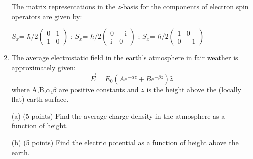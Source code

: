 \documentclass{article}
\begin{document}
\begin{enumerate}
The matrix representations in the $z$-basis for the components of electron spin operators are given by: 

\color{red}\textbf{$S_x$}= $\hbar/2 \begin{pmatrix} 0 & 1 \\ 1 & 0 \end{pmatrix}$ \color{purple}; \hfill \textbf{$S_x$}= $\hbar/2 \begin{pmatrix} 0 & -\mathrm{i} \\ \mathrm{i} & 0 \end{pmatrix}$ \color{orange}; \hfill \textbf{$S_x$}= $\hbar/2 \begin{pmatrix} 1 & 0 \\ 0 & -1 \end{pmatrix}$

\color{black}

\item The average electrostatic field in the earth's atmosphere in fair weather is approximately given: 
\begin{equation}
\vec{E}= E_0(Ae^{-\alpha z}+Be^{-\beta z})\hat{z}
\end{equation}
where A,B,$\alpha$,$\beta$ are positive constants and $z$ is the height above the (locally flat) earth surface.

(a) (5 points) Find the average charge density in the atmosphere as a function of height.

(b) (5 points) Find the electric potential as a function of height above the earth.

\end{enumerate}
\end{document}

